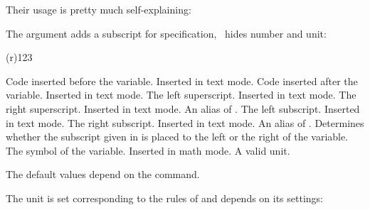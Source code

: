 \documentclass{chemmacros-manual}
\begin{document}
Their usage is pretty much self-explaining:
\begin{example}
   \par
   \par
\end{example}
The argument  adds a subscript for specification, \sarg\ hides
number and unit:
\begin{example}
    \enthalpy(r){123} \par
     \par
\end{example}

\begin{options}
    Code inserted before the variable.  Inserted in text mode.
  \Initial
    Code inserted after the variable.  Inserted in text mode.
  \Initial
    The left superscript.  Inserted in text mode.
    The right superscript. Inserted in text mode.
    An alias of .
  \Initial
    The left subscript.  Inserted in text mode.
  \Initial
    The right subscript.  Inserted in text mode.
    An alias of .
    Determines whether the subscript given in  is placed to the
    left or the right of the variable.
  \Initial
    The symbol of the variable.  Inserted in math mode.
  \Initial
    A valid  unit.
\end{options}

The default values depend on the command.
\begin{example}
   \par
   \par
\end{example}
The unit is set corresponding to the rules of  and depends on
its settings:
\begin{example}
   \par
\end{example}
\end{document}
